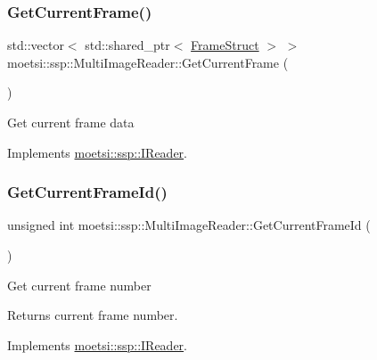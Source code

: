 \subsubsection{\texorpdfstring{Get\+Current\+Frame()}{GetCurrentFrame()}}
{\footnotesize\ttfamily std\+::vector$<$ std\+::shared\+\_\+ptr$<$ \hyperlink{structmoetsi_1_1ssp_1_1FrameStruct}{Frame\+Struct} $>$ $>$ moetsi\+::ssp\+::\+Multi\+Image\+Reader\+::\+Get\+Current\+Frame (\begin{DoxyParamCaption}{ }\end{DoxyParamCaption})\hspace{0.3cm}{\ttfamily [virtual]}}

Get current frame data 

Implements \hyperlink{classmoetsi_1_1ssp_1_1IReader_a357439182128e3911d77335c136035c0}{moetsi\+::ssp\+::\+I\+Reader}.

\mbox{\label{classmoetsi_1_1ssp_1_1MultiImageReader_a994eea20e9682c2f4afc9303a34c76f3}} 
\subsubsection{\texorpdfstring{Get\+Current\+Frame\+Id()}{GetCurrentFrameId()}}
{\footnotesize\ttfamily unsigned int moetsi\+::ssp\+::\+Multi\+Image\+Reader\+::\+Get\+Current\+Frame\+Id (\begin{DoxyParamCaption}{ }\end{DoxyParamCaption})\hspace{0.3cm}{\ttfamily [virtual]}}

Get current frame number \begin{DoxyReturn}{Returns}
current frame number. 
\end{DoxyReturn}


Implements \hyperlink{classmoetsi_1_1ssp_1_1IReader_ac292d83eb06dee277baaa06e281a562d}{moetsi\+::ssp\+::\+I\+Reader}.

\mbox{\label{classmoetsi_1_1ssp_1_1MultiImageReader_ad0a249af66f8e1a063c3e575fc1b94cb}} 
